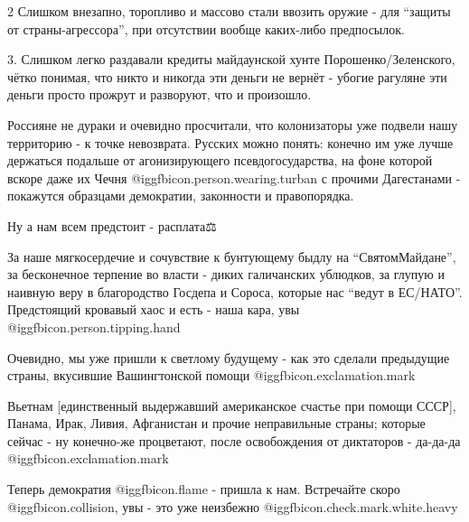 2 Слишком внезапно, торопливо и массово стали ввозить оружие - для
\enquote{защиты от страны-агрессора}, при отсутствии вообще каких-либо
предпосылок.

3. Слишком легко раздавали кредиты майдаунской хунте Порошенко/Зеленского,
чётко понимая, что никто и никогда эти деньги не вернёт - убогие рагуляне эти
деньги просто прожрут и разворуют, что и произошло.

Россияне не дураки и очевидно просчитали, что колонизаторы уже подвели нашу
территорию - к точке невозврата.  Русских можно понять: конечно им уже лучше
держаться подальше от агонизирующего псевдогосударства, на фоне которой вскоре
даже их Чечня @igg{fbicon.person.wearing.turban}  с прочими Дагестанами -
покажутся образцами демократии, законности и правопорядка.

Ну а нам всем предстоит - расплата⚖️

За наше мягкосердечие и сочувствие к бунтующему быдлу на \enquote{СвятомМайдане}, за
бесконечное терпение во власти - диких галичанских ублюдков, за глупую и
наивную веру в благородство Госдепа и Сороса, которые нас \enquote{ведут в ЕС/НАТО}.
Предстоящий кровавый хаос и есть - наша кара, увы  @igg{fbicon.person.tipping.hand} 

Очевидно, мы уже пришли к светлому будущему - как это сделали предыдущие
страны, вкусившие Вашингтонской помощи @igg{fbicon.exclamation.mark}

Вьетнам [единственный выдержавший американское счастье при помощи СССР],
Панама, Ирак, Ливия, Афганистан и прочие неправильные страны; которые сейчас -
ну конечно-же процветают, после освобождения от диктаторов - да-да-да
@igg{fbicon.exclamation.mark}

Теперь демократия @igg{fbicon.flame}  - пришла к нам.  Встречайте скоро
@igg{fbicon.collision}, увы - это уже неизбежно
@igg{fbicon.check.mark.white.heavy} 
